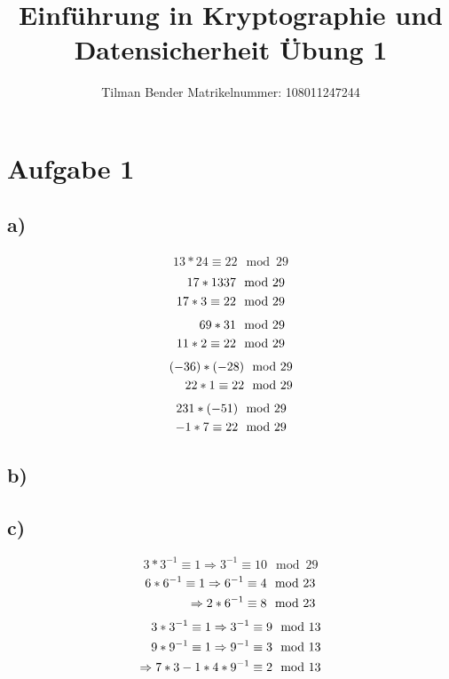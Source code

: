 \documentclass[10pt,a4paper]{article}
\author{Tilman Bender   Matrikelnummer: 108011247244\\}
\title{Einführung in Kryptographie und Datensicherheit Übung 1}
\begin{document}
\maketitle

\section*{Aufgabe 1}
\subsection*{a)}
\renewcommand{\theequation}{\roman{equation}}
\begin{align} 
13*24 \equiv 22 \mod 29 
\end{align}
\begin{align} 
17 * 1337 \mod 29 \notag\\
17 * 3 \equiv 22 \mod 29 \end
{align}
\begin{align} 
69 * 31\mod 29 \notag \\
11 * 2  \equiv 22 \mod 29 \end{align}
\begin{align}  
(-36)*(-28) \mod 29 \notag \\
22 * 1 \equiv 22 \mod 29 \end{align}
\begin{align}
231 * (-51) \mod29  \notag \\
-1 * 7 \equiv 22 \mod 29
 \end{align}
\subsection*{b)}

\subsection*{c)}
\setcounter{equation}{0}
\begin{equation}  3 * 3^{-1} \equiv 1 \Rightarrow 3^{-1} \equiv 10 \mod 29 \end{equation}
\begin{align}   6 * 6^{-1} \equiv 1 \Rightarrow 6^{-1} \equiv 4 \mod 23 \notag\\
 \Rightarrow 2 * 6^{-1} \equiv 8 \mod 23 \end{align}
\begin{align}   
3*3^{-1} \equiv 1\Rightarrow 3^{-1} \equiv 9 \mod 13 \notag \\
9*9^{-1} \equiv 1 \Rightarrow 9^{-1} \equiv  3 \mod 13\\
\Rightarrow 7*3-1*4*9^{-1} \equiv 2 \mod 13 \notag
\end{align}
\end{document}
